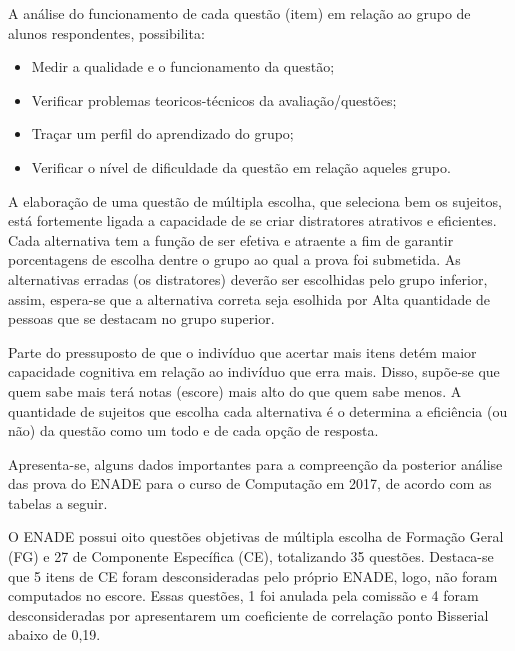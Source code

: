\documentclass[12pt]{article}
\begin{document}
A análise do funcionamento de cada questão (item) em relação ao grupo de alunos respondentes, possibilita: 

\begin{itemize}
    \item Medir a qualidade e o funcionamento da questão;
    \item Verificar problemas teoricos-técnicos da avaliação/questões; 
    \item Traçar um perfil do aprendizado do grupo;
    \item Verificar o nível de dificuldade da questão em relação aqueles grupo.
\end{itemize} 
 

A elaboração de uma questão de múltipla escolha, que seleciona bem os sujeitos, está fortemente ligada a capacidade de se criar distratores atrativos e eficientes. Cada alternativa tem a função de ser efetiva e atraente a fim de garantir porcentagens de escolha dentre o grupo ao qual a prova foi submetida. As alternativas erradas (os distratores) deverão ser escolhidas pelo grupo inferior, assim, espera-se que a alternativa correta seja esolhida por Alta quantidade de pessoas que se destacam no grupo superior.    

Parte do pressuposto de que o indivíduo que acertar mais itens detém maior capacidade cognitiva em relação ao indivíduo que erra mais. Disso, supõe-se que quem sabe mais terá notas (escore) mais alto do que quem sabe menos. A quantidade de sujeitos que escolha cada alternativa é o determina a eficiência (ou não) da questão como um todo e de cada opção de resposta.  

Apresenta-se, alguns dados importantes para a compreenção da posterior análise das prova do ENADE para o curso de Computação em 2017, de acordo com as tabelas a seguir.

















O ENADE possui oito questões objetivas de múltipla escolha de Formação Geral (FG) e 27 de Componente Específica (CE), totalizando 35 questões. Destaca-se que 5 itens de CE foram desconsideradas pelo próprio ENADE, logo, não foram computados no escore. Essas questões, 1 foi anulada pela comissão e 4 foram desconsideradas por apresentarem um coeficiente de correlação ponto Bisserial abaixo de 0,19.
\end{document}
